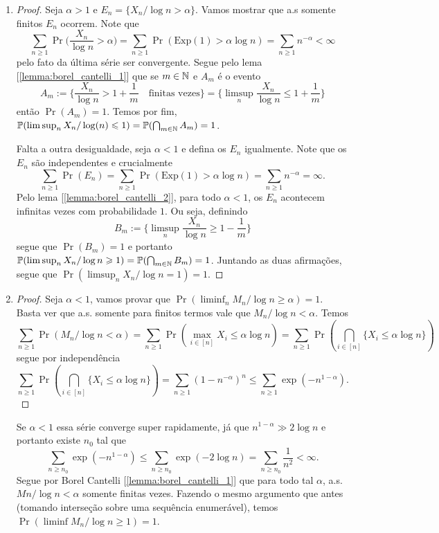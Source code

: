 \begin{enumerate}[label=(\alph*)]
	\item
		\begin{proof}
			Seja $\alpha > 1$ e $E_n = \{X_n/\log n > \alpha\}$. Vamos
			mostrar que a.s somente finitos $E_n$ ocorrem. Note que
			\[
				\sum_{n \geq 1} \Pr\bigg(\frac{X_n}{\log n} > \alpha\bigg) =
				\sum_{n \geq 1} \Pr(\text{Exp}(1) > \alpha \log n)
				= \sum_{n \geq 1} n^{-\alpha} < \infty
			\]
			pelo fato da última série ser convergente. Segue pelo lema
			[\ref{lemma:borel_cantelli_1}] que se $m \in \mathbb{N}$ e
			$A_m$ é o evento
			\[A_m := \bigg\{\frac{X_n}{\log n} > 1 + \frac{1}{m} \quad
				\text{finitas vezes}\bigg\}
			= \bigg\{\limsup_n \frac{X_n}{\log n} \leq 1 + \frac{1}{m}\bigg\}\]
			então $\Pr(A_m) = 1$. Temos por fim, $\mathbb{P}(\limsup_n X_n/\log(n)
			\leqslant 1) = \mathbb{P}(\bigcap_{m \in \mathbb{N}} A_m) = 1$.

			Falta a outra desigualdade, seja $\alpha < 1$ e defina os $E_n$
			igualmente. Note que os $E_n$ são independentes e
			crucialmente
			\[
				\sum_{n \geq 1} \Pr(E_n) = \sum_{n \geq 1} \Pr(\text{Exp}(1) >
				\alpha \log n) = \sum_{n \geq 1} n^{-\alpha} = \infty.
			\]
			Pelo lema [\ref{lemma:borel_cantelli_2}], para todo $\alpha < 1$,
			os $E_n$ acontecem infinitas vezes com probabilidade $1$.
			Ou seja, definindo
			\[
				B_m :=  \bigg\{\limsup_n \frac{X_n}{\log n} \geq 1 - \frac{1}{m}\bigg\}
			\]
			segue que $\Pr(B_m) = 1$ e portanto $\mathbb{P}(\limsup_n X_n/\log n
			\geqslant 1) = \mathbb{P}(\bigcap_{m \in \mathbb{N}} B_m) = 1$. Juntando as duas
			afirmações, segue que $\Pr(\limsup_n X_n/\log n = 1) = 1$.
		\end{proof}	

	\item
		\begin{proof}
			Seja $\alpha < 1$, vamos provar que $\Pr(\liminf_n M_n/\log n
			\geq \alpha) = 1$. Basta ver que a.s.
			somente para finitos termos vale que $M_n/\log n < \alpha$. Temos
			\[	
				\sum_{n \geq 1} \Pr(M_n /\log n < \alpha) = \sum_{n \geq 1}
				\Pr(\max_{i \in [n]} X_i \leq \alpha\log n) = \sum_{n \geq 1}
				\Pr( \bigcap_{i \in [n]} \{X_i \leq \alpha \log n\})
			\]
			segue por independência
			\[
				\sum_{n \geq 1} \Pr( \bigcap_{i \in [n]} \{X_i \leq \alpha \log
				n\}) = \sum_{n \geq 1} (1 - n^{-\alpha})^n \leq \sum_{n \geq 1}
				\exp(-n^{1 - \alpha}).
			\]
		\end{proof}
		Se $\alpha < 1$ essa série converge super rapidamente, já que
		$n^{1 - \alpha} \gg 2\log n$ e portanto existe $n_0$ tal que
		\[
			\sum_{n \geq n_0} \exp(-n^{1 - \alpha}) \leq \sum_{n \geq n_0}
			\exp(- 2\log n) = \sum_{n \geq n_0} \frac{1}{n^2} < \infty.
		\]
		Segue por Borel Cantelli [\ref{lemma:borel_cantelli_1}] que para
		todo tal $\alpha$, a.s. $Mn/ \log n < \alpha$ somente finitas vezes.
		Fazendo o mesmo argumento que antes (tomando interseção sobre uma
		sequência enumerável), temos $\Pr(\liminf M_n / \log n \geq 1) = 1$.


\end{enumerate}
